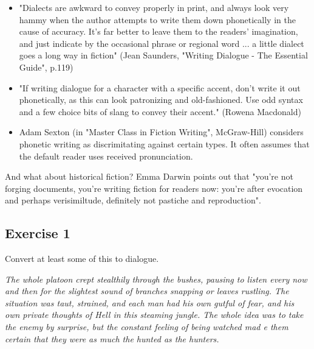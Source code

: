 \documentclass[11pt]{article}
\newenvironment{narrow}[2]{%
 \begin{list}{}{%
  \setlength{\topsep}{0pt}%
  \setlength{\leftmargin}{#1}%
  \setlength{\rightmargin}{#2}%
  \setlength{\listparindent}{\parindent}%
  \setlength{\itemindent}{\parindent}%
  \setlength{\parsep}{\parskip}%
 }%
\item[]}{\end{list}}
\begin{document}
\begin{itemize}
\item "Dialects are awkward to convey properly in print, and always look very hammy when the author attempts to write them down phonetically in the cause of accuracy. It's far better to leave them to the readers' imagination, and just indicate by the occasional phrase or regional word ... a little dialect goes a long way in fiction"  (Jean Saunders, "Writing Dialogue - The Essential Guide", p.119)
\item "If writing dialogue for a character with a specific accent, don't write it out phonetically, as this can look patronizing and old-fashioned. Use odd syntax and a few choice bits of slang to convey their accent." (Rowena Macdonald)
\item Adam Sexton (in "Master Class in Fiction Writing", McGraw-Hill) considers phonetic writing as discrimitating against certain types. It often assumes that the default reader uses received pronunciation.

\end{itemize}

And what about historical fiction? Emma Darwin points out that "you're not forging documents, you're writing fiction for readers now: you're after evocation and perhaps verisimiltude, definitely not pastiche and reproduction".

\subsection*{Exercise 1}
Convert at least some of this to dialogue.
\begin{narrow}{1.0cm}{1.0cm}
 \textit{The whole platoon crept stealthily through the bushes, pausing to listen every now and then for the
slightest sound of branches snapping or leaves rustling. The situation was taut,
 strained, and each man
had his own gutful of fear, and his own private thoughts of Hell in this steaming jungle. The whole idea
was to take the enemy by surprise, but the constant feeling of being watched mad
e them certain that
they were as much the hunted as the hunters.}
\end{narrow}
\end{document}

